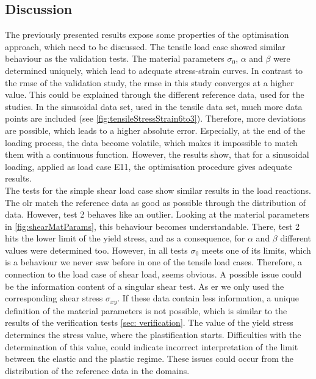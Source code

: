 \subsection{Discussion} \label{subsec:CombiDiscussion}
The previously presented results expose some properties of the optimisation approach, which need to be discussed. The tensile load case showed similar behaviour as the validation tests. The material parameters $\sigma_0$, $\alpha$ and $\beta$ were determined uniquely, which lead to adequate stress-strain curves. In contrast to the \acrshort{rmse} of the validation study, the \acrshort{rmse} in this study converges at a higher value. This could be explained through the different reference data, used for the studies. In the sinusoidal data set, used in the tensile data set, much more data points are included (see \autoref{fig:tensileStressStrain6to3}).
Therefore, more deviations are possible, which leads to a higher absolute error. Especially, at the end of the loading process, the data become volatile, which makes it impossible to match them with a continuous function. However, the results show, that for a sinusoidal loading, applied as load case E11, the optimisation procedure gives adequate results. \\
The tests for the simple shear load case show similar results in the load reactions.
The \acrlong{olr} match the reference data as good as possible through the distribution of data.
However, test 2 behaves like an outlier. Looking at the material parameters in \autoref{fig:shearMatParams}, this behaviour becomes understandable. There, test 2 hits the lower limit of the yield stress, and as a consequence, for $\alpha$ and $\beta$ different values were determined too. However, in all tests $\sigma_0$ meets one of its limits, which is a behaviour we never saw before in one of the tensile load cases.
Therefore, a connection to the load case of shear load, seems obvious.
A possible issue could be the information content of a singular shear test. As \acrlong{er} we only used the corresponding shear stress $\sigma_{xy}$. If these data contain less information, a unique definition of the material parameters is not possible, which is similar to the results of the verification tests \autoref{sec: verification}. The value of the yield stress determines the stress value, where the plastification starts. Difficulties with the determination of this value, could indicate incorrect interpretation of the limit between the elastic and the plastic regime.
These issues could occur from the distribution of the reference data in the domains.
